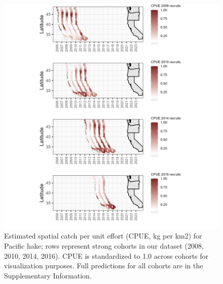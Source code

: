 \documentclass[
]{article}
\begin{document}
\begin{figure}

{\centering \includegraphics[width=6.2in,height=\textheight]{plots/Pacific hake-follow-age-class.png}

}

\caption{\label{fig-hake-spatial-composition}Estimated spatial catch per
unit effort (CPUE, kg per km2) for Pacific hake; rows represent strong
cohorts in our dataset (2008, 2010, 2014, 2016). CPUE is standardized to
1.0 across cohorts for visualization purposes. Full predictions for all
cohorts are in the Supplementary Information.}

\end{figure}

\newpage
\end{document}
